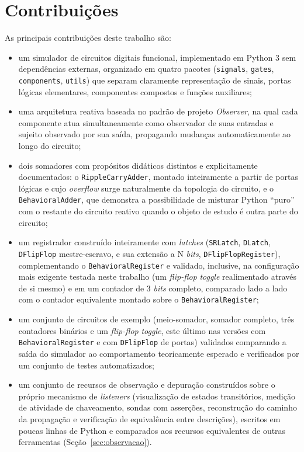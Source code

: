 \section{Contribuições}

As principais contribuições deste trabalho são:

\begin{itemize}
    \item um simulador de circuitos digitais funcional, implementado em Python 3 sem dependências externas, organizado em quatro pacotes (\texttt{signals}, \texttt{gates}, \texttt{components}, \texttt{utils}) que separam claramente representação de sinais, portas lógicas elementares, componentes compostos e funções auxiliares;
    \item uma arquitetura reativa baseada no padrão de projeto \textit{Observer}, na qual cada componente atua simultaneamente como observador de suas entradas e sujeito observado por sua saída, propagando mudanças automaticamente ao longo do circuito;
    \item dois somadores com propósitos didáticos distintos e explicitamente documentados: o \texttt{RippleCarryAdder}, montado inteiramente a partir de portas lógicas e cujo \textit{overflow} surge naturalmente da topologia do circuito, e o \texttt{BehavioralAdder}, que demonstra a possibilidade de misturar Python ``puro'' com o restante do circuito reativo quando o objeto de estudo é outra parte do circuito;
    \item um registrador construído inteiramente com \textit{latches} (\texttt{SRLatch}, \texttt{DLatch}, \texttt{DFlipFlop} mestre-escravo, e sua extensão a N \textit{bits}, \texttt{DFlipFlopRegister}), complementando o \texttt{BehavioralRegister} e validado, inclusive, na configuração mais exigente testada neste trabalho (um \textit{flip-flop} \textit{toggle} realimentado através de si mesmo) e em um contador de 3 \textit{bits} completo, comparado lado a lado com o contador equivalente montado sobre o \texttt{BehavioralRegister};
    \item um conjunto de circuitos de exemplo (meio-somador, somador completo, três contadores binários e um \textit{flip-flop} \textit{toggle}, este último nas versões com \texttt{BehavioralRegister} e com \texttt{DFlipFlop} de portas) validados comparando a saída do simulador ao comportamento teoricamente esperado e verificados por um conjunto de testes automatizados;
    \item um conjunto de recursos de observação e depuração construídos sobre o próprio mecanismo de \textit{listeners} (visualização de estados transitórios, medição de atividade de chaveamento, sondas com asserções, reconstrução do caminho da propagação e verificação de equivalência entre descrições), escritos em poucas linhas de Python e comparados aos recursos equivalentes de outras ferramentas (Seção~\ref{sec:observacao}).
\end{itemize}

